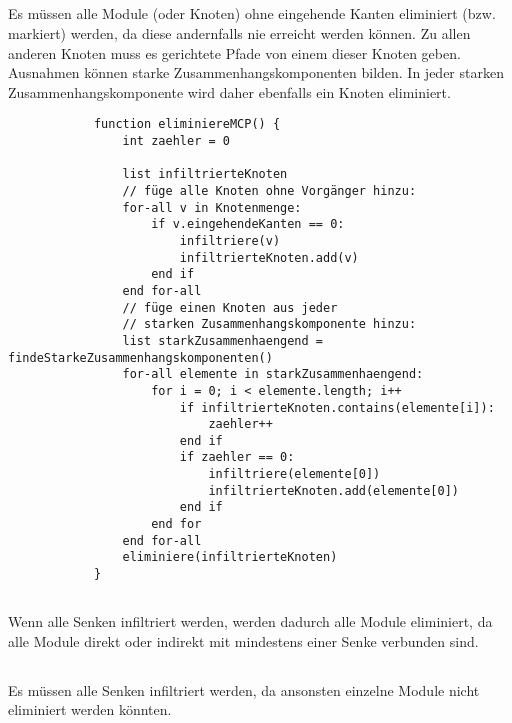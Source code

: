 \documentclass[10pt,a4paper,oneside,ngerman,numbers=noenddot]{scrartcl}
\begin{document}
	\subsection{} %
        Es müssen alle Module (oder Knoten) ohne eingehende Kanten eliminiert (bzw. markiert) werden, da diese andernfalls nie erreicht werden können. Zu allen anderen Knoten muss es gerichtete Pfade von einem dieser Knoten geben. Ausnahmen können starke Zusammenhangskomponenten bilden. In jeder starken Zusammenhangskomponente wird daher ebenfalls ein Knoten eliminiert.
        \newpage
        \begin{verbatim}
            function eliminiereMCP() {
                int zaehler = 0

                list infiltrierteKnoten
                // füge alle Knoten ohne Vorgänger hinzu:
                for-all v in Knotenmenge:
                    if v.eingehendeKanten == 0:
                        infiltriere(v)
                        infiltrierteKnoten.add(v)
                    end if
                end for-all
                // füge einen Knoten aus jeder
                // starken Zusammenhangskomponente hinzu:
                list starkZusammenhaengend = findeStarkeZusammenhangskomponenten()
                for-all elemente in starkZusammenhaengend:
                    for i = 0; i < elemente.length; i++
                        if infiltrierteKnoten.contains(elemente[i]):
                            zaehler++
                        end if
                        if zaehler == 0:
                            infiltriere(elemente[0])
                            infiltrierteKnoten.add(elemente[0])
                        end if
                    end for
                end for-all
                eliminiere(infiltrierteKnoten)
            }
                \end{verbatim}
	\subsection{} %
		Wenn alle Senken infiltriert werden, werden dadurch alle Module eliminiert, da alle Module direkt oder indirekt mit mindestens einer Senke verbunden sind.
	\subsection{} %
		Es müssen alle Senken infiltriert werden, da ansonsten einzelne Module nicht eliminiert werden könnten.
	
\end{document}
